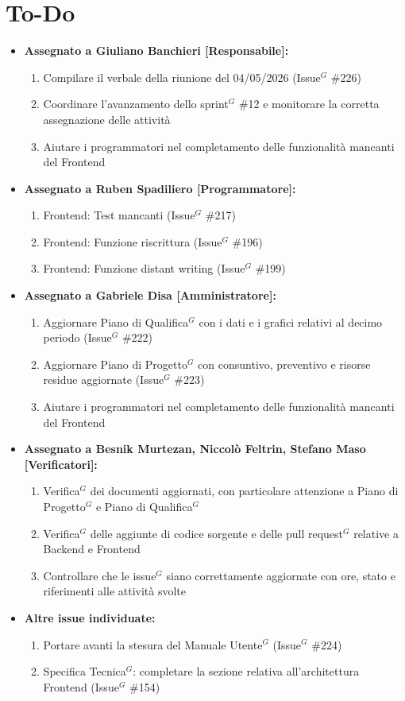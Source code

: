 \documentclass[a4paper,10pt]{article}
\begin{document}
\section*{To-Do}
\begin{itemize}
\item \textbf{Assegnato a Giuliano Banchieri [Responsabile]:}
    \begin{enumerate}
    \item Compilare il verbale della riunione del 04/05/2026 (Issue$^G$ \#226)
    \item Coordinare l'avanzamento dello sprint$^G$ \#12 e monitorare la corretta assegnazione delle attività
    \item Aiutare i programmatori nel completamento delle funzionalità mancanti del Frontend
    \end{enumerate}

\item \textbf{Assegnato a Ruben Spadiliero [Programmatore]:}
    \begin{enumerate}
        \item Frontend: Test mancanti (Issue$^G$ \#217)
        \item Frontend: Funzione riscrittura (Issue$^G$ \#196)
        \item Frontend: Funzione distant writing (Issue$^G$ \#199)
  \end{enumerate}

\item \textbf{Assegnato a Gabriele Disa [Amministratore]:}
    \begin{enumerate}
    \item Aggiornare Piano di Qualifica$^G$ con i dati e i grafici relativi al decimo periodo (Issue$^G$ \#222)
    \item Aggiornare Piano di Progetto$^G$ con consuntivo, preventivo e risorse residue aggiornate (Issue$^G$ \#223)
    \item Aiutare i programmatori nel completamento delle funzionalità mancanti del Frontend
    \end{enumerate}

\item \textbf{Assegnato a Besnik Murtezan, Niccolò Feltrin, Stefano Maso [Verificatori]:}
    \begin{enumerate}
    \item Verifica$^G$ dei documenti aggiornati, con particolare attenzione a Piano di Progetto$^G$ e Piano di Qualifica$^G$
    \item Verifica$^G$ delle aggiunte di codice sorgente e delle pull request$^G$ relative a Backend e Frontend
    \item Controllare che le issue$^G$ siano correttamente aggiornate con ore, stato e riferimenti alle attività svolte
    \end{enumerate}

\item \textbf{Altre issue individuate:}
    \begin{enumerate}
    \item Portare avanti la stesura del Manuale Utente$^G$ (Issue$^G$ \#224)
    \item Specifica Tecnica$^G$: completare la sezione relativa all'architettura Frontend (Issue$^G$ \#154)
    \end{enumerate}
\end{itemize}
\end{document}
